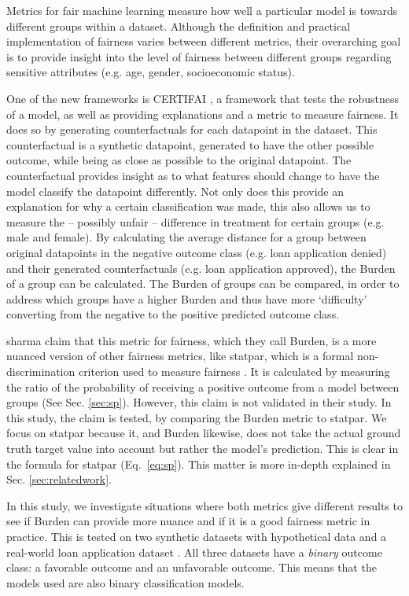 \documentclass[runningheads]{llncs}
\begin{document}
Metrics for fair machine learning measure how well a particular model is towards different groups within a dataset. Although the definition and practical implementation of fairness varies between different metrics, their overarching goal is to provide insight into the level of fairness between different groups regarding sensitive attributes (e.g. age, gender, socioeconomic status).

One of the new frameworks is CERTIFAI \cite{certifai}, a framework that tests the robustness of a model, as well as providing explanations and a metric to measure fairness. It does so by generating counterfactuals for each datapoint in the dataset. This counterfactual is a synthetic datapoint, generated to have the other possible outcome, while being as close as possible to the original datapoint. The counterfactual provides insight as to what features should change to have the model classify the datapoint differently. Not only does this provide an explanation for why a certain classification was made, this also allows us to measure the -- possibly unfair -- difference in treatment for certain groups (e.g. male and female). By calculating the average distance for a group between original datapoints in the negative outcome class (e.g. loan application denied) and their generated counterfactuals (e.g. loan application approved), the \gls{Burden} of a group can be calculated. The \gls{Burden} of groups can be compared, in order to address which groups have a higher \gls{Burden} and thus have more `difficulty' converting from the negative to the positive predicted outcome class.

\gls{sharma} claim that this metric for fairness, which they call \gls{Burden}, is a more nuanced version of other fairness metrics, like \gls{statpar}, which is a formal non-discrimination criterion used to measure fairness \cite{kamiran2009demographicparity}. It is calculated by measuring the ratio of the probability of receiving a positive outcome from a model between groups (See Sec. \ref{sec:sp}). However, this claim is not validated in their study. In this study, the claim is tested, by comparing the \gls{Burden} metric to \gls{statpar}. We focus on \gls{statpar} because it, and \gls{Burden} likewise, does not take the actual ground truth target value into account but rather the model's prediction. This is clear in the formula for \gls{statpar} (Eq.~\ref{eq:sp}). This matter is more in-depth explained in Sec. \ref{sec:relatedwork}.

In this study, we investigate situations where both metrics give different results to see if \gls{Burden} can provide more nuance and if it is a good fairness metric in practice. This is tested on two synthetic datasets with hypothetical data and a real-world loan application dataset \cite{dataset}. All three datasets have a \emph{binary} outcome class: a favorable outcome and an unfavorable outcome. This means that the models used are also binary classification models.
\end{document}
